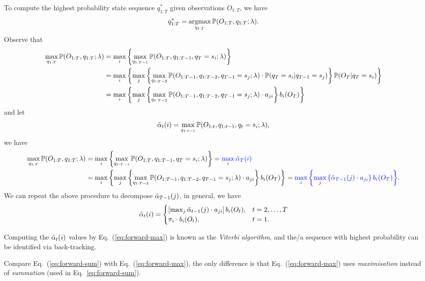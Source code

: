 To compute the highest probability state sequence $q_{1:T}^*$ given observations $O_{1:T}$, we have
\begin{equation*}
q_{1:T}^* = \operatorname*{argmax}_{q_{1:T}} \mathbb{P}(O_{1:T}, q_{1:T} ;\lambda).
\end{equation*}
Observe that 
\begin{align*}
\max_{q_{1:T}} \mathbb{P}(O_{1:T}, q_{1:T} ;\lambda) 
&= \max_{i} \left\{ \max_{q_{1:T-1}} \mathbb{P}(O_{1:T}, q_{1:T-1}, q_T = s_i ;\lambda) \right\} \\
&= \max_{i} \left\{ \max_{j} \left\{ \max_{q_{1:T-2}} \mathbb{P}(O_{1:T-1}, q_{1:T-2}, q_{T-1} = s_j ;\lambda) \cdot 
   \mathbb{P}(q_T = s_i |q_{T-1} = s_j) \right\} \mathbb{P}(O_T |q_T = s_i) \right\} \\
&= \max_{i} \left\{ \max_{j} \left\{ \max_{q_{1:T-2}} \mathbb{P}(O_{1:T-1}, q_{1:T-2}, q_{T-1} = s_j ;\lambda) \cdot a_{ji} \right\} b_i(O_T) \right\}
\end{align*}
and let 
\begin{equation}
\label{eq:alphat}
\tilde{\alpha}_{t}(i) = \max_{q_{1:t-1}} \mathbb{P}(O_{1:t}, q_{1:t-1}, q_t = s_i ;\lambda),
\end{equation}
we have
\begin{align*}
\max_{q_{1:T}} \mathbb{P}(O_{1:T}, q_{1:T} ;\lambda) 
&= \max_{i} \left\{ \max_{q_{1:T-1}} \mathbb{P}(O_{1:T}, q_{1:T-1}, q_T = s_i ;\lambda) \right\} 
 = {\color{blue}{\max_{i} \tilde{\alpha}_{T}(i)}} \\
&= \max_{i} \left\{ \max_{j} \left\{ \max_{q_{1:T-2}} \mathbb{P}(O_{1:T-1}, q_{1:T-2}, q_{T-1} = s_j ;\lambda) \cdot a_{ji} \right\} b_i(O_T) \right\}
 = {\color{blue}{\max_{i} \left\{ \max_{j} \left\{ \tilde{\alpha}_{T-1}(j) \cdot a_{ji} \right\} b_i(O_T) \right\}}}.
\end{align*}
We can repeat the above procedure to decompose $\tilde{\alpha}_{T-1}(j)$, in general, we have
\begin{equation}
\label{eq:forward-max}
\tilde{\alpha}_t(i) = \begin{cases}
                \left[ \max_{j} \tilde{\alpha}_{t-1}(j) \cdot a_{ji} \right] b_i(O_t), & t=2,\dots,T \\
                \pi_i \cdot b_i(O_t), & t=1.
               \end{cases}
\end{equation}

Computing the $\tilde{\alpha}_t(i)$ values by Eq.~(\ref{eq:forward-max}) is known as the \emph{Viterbi algorithm}, 
and the/a sequence with highest probability can be identified via back-tracking.

Compare Eq.~(\ref{eq:forward-sum}) with Eq.~(\ref{eq:forward-max}), 
the only difference is that Eq.~(\ref{eq:forward-max}) uses \emph{maximisation} instead of \emph{summation} (used in Eq.~\ref{eq:forward-sum}).


